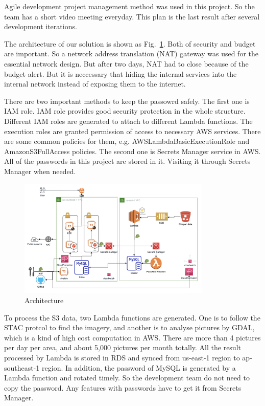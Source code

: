 \documentclass[conference]{IEEEtran}
\begin{document}
Agile development project management method was used in this project. So the team has a short video meeting everyday. This plan is the last 
result after several development iterations.

The architecture of our solution is shown as Fig.~\ref{fig2}. Both of security and budget are important. So a network address translation (NAT) gateway 
was used for the essential network design. But after two days, NAT had to close because of the budget alert. But it is neccessary that hiding the 
internal services into the internal network instead of exposing them to the internet.

There are two important methods to keep the passowrd safely. The first one is IAM role. IAM role provides good security protection in the whole structure.
Different IAM roles are generated to attach to different Lambda functions. The execution roles are granted permission of access to necessary AWS services. 
There are some common policies for them, e.g. AWSLambdaBasicExecutionRole and AmazonS3FullAccess policies. The second one is Secrets Manager service in AWS.
All of the passwords in this project are stored in it. Visiting it through Secrets Manager when needed.


\begin{figure}[htbp]
    \centerline{\includegraphics[width=260pt]{images/arch.png}}
    \caption{Architecture}
    \label{fig2}
\end{figure}
    
To process the S3 data, two Lambda functions are generated. One is to follow the STAC protcol to find the imagery, and another is to analyse pictures by GDAL, 
which is a kind of high cost computation in AWS. There are more than 4 pictures per day per area, and about 5,000 pictures per month totally. All the result processed by 
Lambda is stored in RDS and synced from us-east-1 region to ap-southeast-1 region. In addition, the password of MySQL is generated by a Lambda function and rotated 
timely. So the development team do not need to copy the password. Any features with passwords have to get it from Secrets Manager.  
\end{document}
